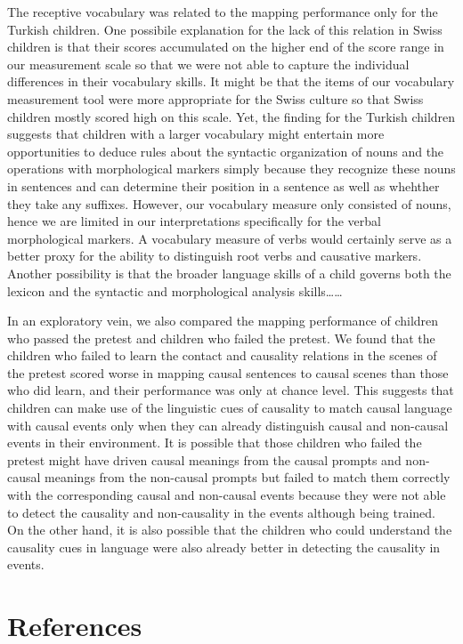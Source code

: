 \documentclass[man]{apa6}
\begin{document}
The receptive vocabulary was related to the mapping performance only for
the Turkish children. One possibile explanation for the lack of this
relation in Swiss children is that their scores accumulated on the
higher end of the score range in our measurement scale so that we were
not able to capture the individual differences in their vocabulary
skills. It might be that the items of our vocabulary measurement tool
were more appropriate for the Swiss culture so that Swiss children
mostly scored high on this scale. Yet, the finding for the Turkish
children suggests that children with a larger vocabulary might entertain
more opportunities to deduce rules about the syntactic organization of
nouns and the operations with morphological markers simply because they
recognize these nouns in sentences and can determine their position in a
sentence as well as whehther they take any suffixes. However, our
vocabulary measure only consisted of nouns, hence we are limited in our
interpretations specifically for the verbal morphological markers. A
vocabulary measure of verbs would certainly serve as a better proxy for
the ability to distinguish root verbs and causative markers. Another
possibility is that the broader language skills of a child governs both
the lexicon and the syntactic and morphological analysis
skills\ldots{}\ldots{}

In an exploratory vein, we also compared the mapping performance of
children who passed the pretest and children who failed the pretest. We
found that the children who failed to learn the contact and causality
relations in the scenes of the pretest scored worse in mapping causal
sentences to causal scenes than those who did learn, and their
performance was only at chance level. This suggests that children can
make use of the linguistic cues of causality to match causal language
with causal events only when they can already distinguish causal and
non-causal events in their environment. It is possible that those
children who failed the pretest might have driven causal meanings from
the causal prompts and non-causal meanings from the non-causal prompts
but failed to match them correctly with the corresponding causal and
non-causal events because they were not able to detect the causality and
non-causality in the events although being trained. On the other hand,
it is also possible that the children who could understand the causality
cues in language were also already better in detecting the causality in
events.

\newpage

\section{References}\label{references}
\end{document}
